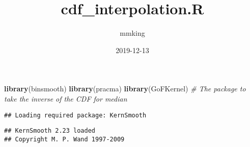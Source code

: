 \documentclass[]{article}
\title{cdf\_interpolation.R}
\author{mmking}
\date{2019-12-13}
\newenvironment{Shaded}{\begin{snugshade}}{\end{snugshade}}
\newcommand{\CommentTok}[1]{\textcolor[rgb]{0.56,0.35,0.01}{\textit{#1}}}
\newcommand{\KeywordTok}[1]{\textcolor[rgb]{0.13,0.29,0.53}{\textbf{#1}}}
\newcommand{\NormalTok}[1]{#1}
\begin{document}
\maketitle

\begin{Shaded}
\begin{Highlighting}[]
\KeywordTok{library}\NormalTok{(binsmooth)}
\KeywordTok{library}\NormalTok{(pracma)}
\KeywordTok{library}\NormalTok{(GoFKernel) }\CommentTok{# The package to take the inverse of the CDF for median}
\end{Highlighting}
\end{Shaded}

\begin{verbatim}
## Loading required package: KernSmooth
\end{verbatim}

\begin{verbatim}
## KernSmooth 2.23 loaded
## Copyright M. P. Wand 1997-2009
\end{verbatim}
\end{document}
